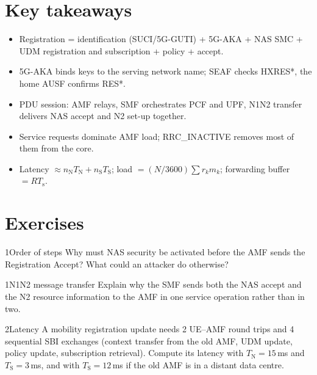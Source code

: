 \documentclass[11pt,a4paper]{article}
\begin{document}
\section{Key takeaways}
\begin{takeawaybox}
\begin{itemize}
  \item Registration = identification (SUCI/5G-GUTI) + 5G-AKA + NAS SMC + UDM registration and subscription + policy + accept.
  \item 5G-AKA binds keys to the serving network name; SEAF checks HXRES*, the home AUSF confirms RES*.
  \item PDU session: AMF relays, SMF orchestrates PCF and UPF, N1N2 transfer delivers NAS accept and N2 set-up together.
  \item Service requests dominate AMF load; RRC\_INACTIVE removes most of them from the core.
  \item Latency $\approx n_{\mathrm{N}}T_{\mathrm{N}} + n_{\mathrm{S}}T_{\mathrm{S}}$; load $= (N/3600)\sum r_k m_k$; forwarding buffer $= RT_{\mathrm{s}}$.
\end{itemize}
\end{takeawaybox}

\section{Exercises}

\begin{exercisebox}{1}{Order of steps}\label{exr:order}
Why must NAS security be activated before the AMF sends the Registration Accept? What could an attacker do otherwise?
\end{exercisebox}

\begin{exercisebox}{1}{N1N2 message transfer}\label{exr:n1n2}
Explain why the SMF sends both the NAS accept and the N2 resource information to the AMF in one service operation rather than in two.
\end{exercisebox}

\begin{exercisebox}{2}{Latency}\label{exr:latency}
A mobility registration update needs 2 UE--AMF round trips and 4 sequential SBI exchanges (context transfer from the old AMF, UDM update,
policy update, subscription retrieval). Compute its latency with $T_{\mathrm{N}} = 15$\,ms and $T_{\mathrm{S}} = 3$\,ms, and with $T_{\mathrm{S}} = 12$\,ms if the
old AMF is in a distant data centre.
\end{exercisebox}
\end{document}
